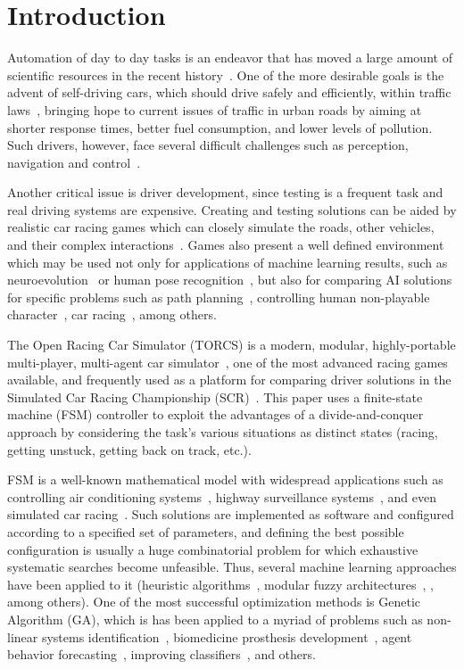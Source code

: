 \section{Introduction}\label{sec:1}

Automation of day to day tasks is an endeavor that has moved a large amount of scientific resources in the recent history~\cite{INDUS,APPLI}. One of the more desirable goals is the advent of self-driving cars, which should drive safely and efficiently, within traffic laws~\cite{SAFE,AUTOM}, bringing hope to current issues of traffic in urban roads by aiming at shorter response times, better fuel consumption, and lower levels of pollution. Such drivers, however, face several difficult challenges such as perception, navigation and control~\cite{6179503}.

Another critical issue is driver development, since testing is a frequent task and real driving systems are expensive. Creating and testing solutions can be aided by realistic car racing games which can closely simulate the roads, other vehicles, and their complex interactions~\cite{caldeira2013torcs}. Games also present a well defined environment which may be used not only for applications of machine learning results, such as neuroevolution~\cite{stanley_real-time_2005,} or human pose recognition~\cite{Shotton:2011}, but also for comparing AI solutions for specific problems such as path planning~\cite{deFreitas:2012}, controlling human non-playable character~\cite{simon2008}, car racing~\cite{2009}, among others.

The Open Racing Car Simulator (TORCS) is a modern, modular, highly-portable multi-player, multi-agent car simulator~\cite{SIMUTORCS}, one of the most advanced racing games available, and frequently used as a platform for comparing driver solutions in the Simulated Car Racing Championship (SCR)~\cite{2009,Loiacono:2012:LEA:2212908.2212953}. This paper uses a finite-state machine (FSM) controller to exploit the advantages of a divide-and-conquer approach by considering the task's various situations as distinct states (racing, getting unstuck, getting back on track, etc.).

FSM is a well-known mathematical model with widespread applications such as controlling air conditioning systems~\cite{BERNARD}, highway surveillance systems~\cite{DOHYUN}, and even simulated car racing~\cite{DIEGO}. Such solutions are implemented as software and configured according to a specified set of parameters, and defining the best possible configuration is usually a huge combinatorial problem for which exhaustive systematic searches become unfeasible. Thus, several machine learning approaches have been applied to it (heuristic algorithms~\cite{MrRacer}, modular fuzzy architectures~\cite{AUTOPIA}, , among others). One of the most successful optimization methods is Genetic Algorithm (GA), which is has been applied to a myriad of problems such as non-linear systems identification~\cite{GACTRL}, biomedicine prosthesis development~\cite{GABIO}, agent behavior forecasting~\cite{GAECO}, improving classifiers~\cite{pedrycz_genetic_2005}, and others.

